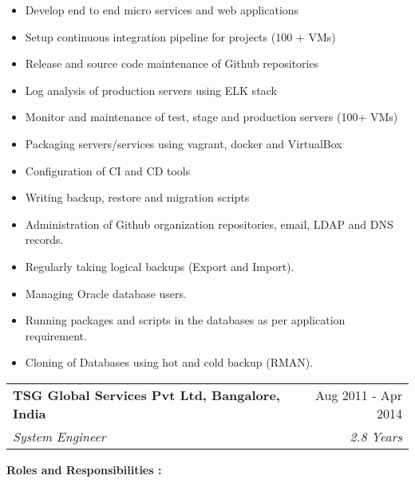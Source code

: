 \documentclass[letterpaper,11pt]{article}
\makeatletter
\newcommand{\resumeSubheading}[4]{
  \vspace{-1pt}\item
    \begin{tabular*}{0.97\textwidth}{l@{\extracolsep{\fill}}r}
      \textbf{#1} & #2 \\
      \textit{\small#3} & \textit{\small #4} \\
    \end{tabular*}\vspace{-5pt}
}
\makeatother
\begin{document}
     \begin{itemize}
      
    \item Develop end to end micro services and web
      applications

    \item Setup continuous integration pipeline for projects
      (100 + VMs)

    \item Release and source code maintenance of Github
      repositories

    \item Log analysis of production servers using ELK stack      
      
    \item Monitor and maintenance of test, stage and production
      servers (100+ VMs)
      
    \item Packaging servers/services using vagrant,
      docker and VirtualBox

    \item Configuration of CI and CD tools
      
    \item Writing backup, restore and migration scripts

    \item Administration of Github organization repositories,
      email, LDAP and DNS records.
     
    \item Regularly taking logical backups (Export and Import).
    
    \item Managing Oracle database users.
    
    \item Running packages and scripts in the databases as per application requirement.
    
    \item Cloning of Databases using hot and cold backup (RMAN). 

    \end{itemize}
    \resumeSubheading
      {TSG Global Services Pvt Ltd, Bangalore, India}{ Aug 2011 - Apr 2014}
      {System Engineer}{2.8 Years}
    \newline
    \newline

    \textbf{Roles and Responsibilities :}
\end{document}

